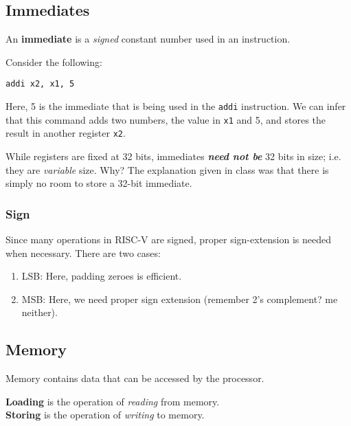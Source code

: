 \documentclass{report}
\newcommand{\definition}[2]{\begin{tcolorbox}[title={Definition: #1}]{#2}\end{tcolorbox}}
\newcommand{\example}[2]{\begin{tcolorbox}[colback=blue!5!white,colframe=black!75!blue,title={Example:
      #1}]{#2}\end{tcolorbox}}
\newcommand{\corollary}[2]{\begin{tcolorbox}[colback=teal!5!white,colframe=black!75!teal,title={Corollary:
      #1}]{#2}\end{tcolorbox}}
\begin{document}
\subsection{Immediates}
\definition{Immediate}{
  An \textbf{immediate} is a \textit{signed} constant number used in an instruction.
}

\example{\texttt{addi}}{
  Consider the following:
  \begin{center}
    \texttt{addi x2, x1, 5}
  \end{center}
  Here, 5 is the immediate that is being used in the \texttt{addi} instruction. We can infer that
  this command adds two numbers, the value in \texttt{x1} and 5, and stores the result in another
  register \texttt{x2}.
}

\corollary{IMPORTANT: Immediate Sizes}{
  While registers are fixed at 32 bits, immediates \textbf{\textit{need not be}} 32 bits in
  size; i.e. they are \textit{variable} size. Why? The explanation given in class was that there is
  simply no room to store a 32-bit immediate.
}

\subsubsection{Sign}
Since many operations in RISC-V are signed, proper sign-extension is needed when necessary. There
are two cases:
\begin{enumerate}[label=\textit{Case (\roman*)}]
\item LSB: Here, padding zeroes is efficient.
\item MSB: Here, we need proper sign extension (remember 2's complement? me neither).
\end{enumerate}


\subsection{Memory}\label{subsec:OPMEM}
Memory contains data that can be accessed by the processor.
\definition{Load and Store}{
  \textbf{Loading} is the operation of \textit{reading} from memory. \\
  \textbf{Storing} is the operation of \textit{writing} to memory.
}
\end{document}
